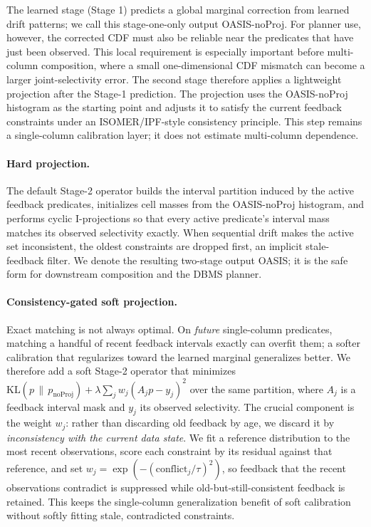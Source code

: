 \documentclass[preprint,12pt]{elsarticle}
\begin{document}
The learned stage (Stage 1) predicts a global marginal correction from learned
drift patterns; we call this stage-one-only output OASIS-noProj. For planner use,
however, the corrected CDF must also be reliable near the predicates that have
just been observed. This local requirement is especially important before
multi-column composition, where a small one-dimensional CDF mismatch can become a
larger joint-selectivity error. The second stage therefore applies a lightweight
projection after the Stage-1 prediction. The projection uses the OASIS-noProj
histogram as the starting point and adjusts it to satisfy the current feedback
constraints under an ISOMER/IPF-style consistency principle. This step remains a
single-column calibration layer; it does not estimate multi-column dependence.

\paragraph{Hard projection.}
The default Stage-2 operator builds the interval partition induced by the active
feedback predicates, initializes cell masses from the OASIS-noProj histogram, and
performs cyclic I-projections so that every active predicate's interval mass
matches its observed selectivity exactly. When sequential drift makes the active
set inconsistent, the oldest constraints are dropped first, an implicit
stale-feedback filter. We denote the resulting two-stage output OASIS; it is the
safe form for downstream composition and the DBMS planner.

\paragraph{Consistency-gated soft projection.}
Exact matching is not always optimal. On \emph{future} single-column predicates,
matching a handful of recent feedback intervals exactly can overfit them; a
softer calibration that regularizes toward the learned marginal generalizes
better. We therefore add a soft Stage-2 operator that minimizes
$\mathrm{KL}(p\,\|\,p_{\text{noProj}}) + \lambda \sum_j w_j (A_j p - y_j)^2$ over
the same partition, where $A_j$ is a feedback interval mask and $y_j$ its
observed selectivity. The crucial component is the weight $w_j$: rather than
discarding old feedback by age, we discard it by \emph{inconsistency with the
current data state}. We fit a reference distribution to the most recent
observations, score each constraint by its residual against that reference, and
set $w_j = \exp(-(\text{conflict}_j/\tau)^2)$, so feedback that the recent
observations contradict is suppressed while old-but-still-consistent feedback is
retained. This keeps the single-column generalization benefit of soft
calibration without softly fitting stale, contradicted constraints.
\end{document}
